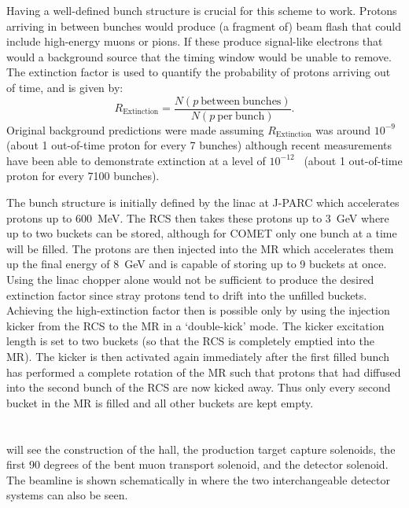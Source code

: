 Having a well-defined bunch structure is crucial for this scheme to work. 
Protons arriving in between bunches would produce (a fragment of) beam flash that could include high-energy muons or pions.   
If these produce signal-like electrons that would a background source that the timing window would be unable to remove.
The extinction factor is used to quantify the probability of protons arriving out of time, and is given by:
\begin{equation}
	R_\mathrm{Extinction}=\frac{N(p~\mathrm{between~bunches})}{N(p~\mathrm{per~bunch})}.
\end{equation}
Original background predictions were made assuming $R_\mathrm{Extinction}$ was around $10^{-9}$~\cite{CDRphase2} (about 1 out-of-time proton for every 7 \phaseI bunches) although recent measurements have been able to demonstrate extinction at a level of $10^{-12}$~\cite{TDR2016} (about 1 out-of-time proton for every 7100 \phaseI bunches).

The bunch structure is initially defined by the linac at J-PARC which accelerates protons up to 600~MeV.
The \ac{RCS} then takes these protons up to 3~GeV where up to two buckets can be stored, although for COMET only one bunch at a time will be filled.
The protons are then injected into the \ac{MR} which accelerates them up the final energy of 8~GeV and is capable of storing up to 9 buckets at once.
Using the linac chopper alone would not be sufficient to produce the desired extinction factor since stray protons tend to drift into the unfilled buckets.
Achieving the high-extinction factor then is possible only by using the injection kicker from the \ac{RCS} to the \ac{MR} in a `double-kick' mode.
The kicker excitation length is set to two buckets (so that the \ac{RCS} is completely emptied into the \ac{MR}).  
The kicker is then activated again immediately after the first filled bunch has performed a complete rotation of the \ac{MR} such that protons that had diffused into the second bunch of the \ac{RCS} are now kicked away.
Thus only every second bucket in the \ac{MR} is filled and all other buckets are kept empty.

\section{\COMET \phaseI}
\phaseI will see the construction of the \COMET hall, the production target capture solenoids, the first 90 degrees of the bent muon transport solenoid, and the detector solenoid.  
The beamline is shown schematically in  where the two interchangeable detector systems can also be seen.

